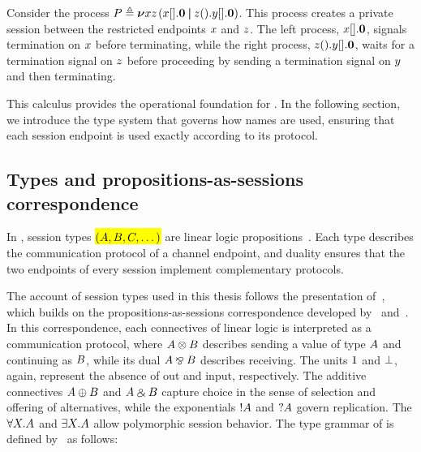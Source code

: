 \begin{example}\label{ex:cut-unit-proc}
  Consider the process {$P \triangleq {\boldsymbol{\nu}{xz}\mspace{2mu}}{({{x[]}{.}\mathbf{0}} \mathbin{\boldsymbol{|}}{{z()}{.}{{y[]}{.}\mathbf{0}}})}$}. This process creates a private session between the restricted endpoints {$x$} and {$z$}. The left process, {${{x[]}{.}\mathbf{0}}$}, signals termination on {$x$} before terminating, while the right process, {${{z()}{.}{{y[]}{.}\mathbf{0}}}$}, waits for a termination signal on {$z$} before proceeding by sending a termination signal on {$y$} and then terminating.
\end{example}

This calculus provides the operational foundation for \pill. In the following section, we introduce the type system that governs how names are used, ensuring that each session endpoint is used exactly according to its protocol.

\subsection{Types and propositions-as-sessions correspondence}\label{subsec:types}
In \pill, session types \hl{$(A, B, C, \dots)$} are linear logic propositions~\citep{CP10, W14, abs-2106-11818}. Each type describes the communication protocol of a channel endpoint, and duality ensures that the two endpoints of every session implement complementary protocols.

The account of session types used in this thesis follows the presentation of~\citet{abs-2106-11818}, which builds on the propositions-as-sessions correspondence developed by~\citet{CLMSW16} and~\citet{W14}. In this correspondence, each connectives of linear logic is interpreted as a communication protocol, where {$A \otimes B$} describes sending a value of type {$A$} and continuing as {$B$}, while its dual {$A \mathbin{\bindnasrepma} B$} describes receiving. The units {$1$ and $\bot$}, again, represent the absence of out and input, respectively. The additive connectives {$A \oplus B$} and {$A \mathbin{\binampersand} B$} capture choice in the sense of selection and offering of alternatives, while the exponentials {$\mathord{!} A$} and {$\mathord{?} A$} govern replication. The {$\forall X.A$} and {$\exists X.A$} allow polymorphic session behavior. The type grammar of \pill{} is defined by~\citet{abs-2106-11818} as follows:

